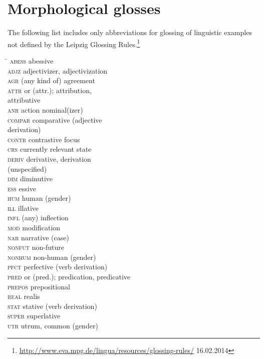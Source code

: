 

\section{Morphological glosses}
The following list includes only abbreviations for glossing of linguistic examples not defined by the Leipzig Glossing Rules.\footnote{\url{http://www.eva.mpg.de/lingua/resources/glossing-rules/} 16.02.2014}
\begin{multicols}{2}
\begin{tabbing}
\TABh \= \kill
\textsc{abess} \> abessive\\
\textsc{adjz} \> adjectivizer, adjectivization\\
\textsc{agr} \> (any kind of) agreement\\
\textsc{attr} \> or (attr.); attribution,\\ \> attributive\\
\textsc{anr} \> action nominal(izer)\\
\textsc{compar} \> comparative (adjective\\ \> derivation)\\
\textsc{contr} \> contrastive focus\\
\textsc{crs} \> currently relevant state\\
\textsc{deriv} \> derivative, derivation\\ \> (unspecified)\\
\textsc{dim} \> diminutive\\
\textsc{ess} \> essive\\
\textsc{hum} \> human (gender)\\
\textsc{ill} \> illative\\
\textsc{infl} \> (any) inflection\\
\textsc{mod} \> modification\\
\textsc{nar} \> narrative (case)\\
\textsc{nonfut} \> non-future\\
\textsc{nonhum} \> non-human (gender)\\
\textsc{pfct} \> perfective (verb derivation)\\
\textsc{pred} \> or (pred.); predication, predicative\\
\textsc{prepos} \> prepositional\\
\textsc{real} \> realis\\
\textsc{stat} \> stative (verb derivation)\\
\textsc{super} \> superlative\\
\textsc{utr} \> utrum, common (gender)
\end{tabbing}
\end{multicols}

